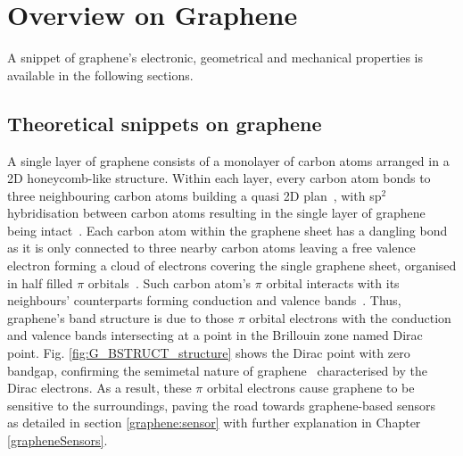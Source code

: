 \chapter{Overview on Graphene}
\label{grapheneTheory}
A snippet of graphene's electronic, geometrical and mechanical properties is available in the following sections.
\section{Theoretical snippets on graphene}
A single layer of graphene consists of a monolayer of carbon atoms arranged in a 2D honeycomb-like structure. Within each layer, every carbon atom bonds to three neighbouring carbon atoms building a quasi 2D plan~\cite{Neto2009}, with sp$^\textrm{2}$ hybridisation between carbon atoms resulting in the single layer of graphene being intact~\cite{Neto2009}. Each carbon atom within the graphene sheet has a dangling bond as it is only connected to three nearby carbon atoms leaving a free valence electron forming a cloud of electrons covering the single graphene sheet, organised in half filled $\pi$ orbitals~\cite{Neto2009}. Such carbon atom's $\pi$ orbital interacts with its neighbours' counterparts forming conduction and valence bands~\cite{Bolotin2008, Morozov2008, Basu2012}. Thus, graphene's band structure is due to those $\pi$ orbital electrons with the conduction and valence bands intersecting at a point in the Brillouin zone named Dirac point. Fig. \ref{fig:G_BSTRUCT_structure} shows the Dirac point with zero bandgap, confirming the semimetal nature of graphene~\cite{Wallace1947} characterised by the Dirac electrons. As a result, these $\pi$ orbital electrons cause graphene to be sensitive to the surroundings, paving the road towards graphene-based sensors~\cite{He2012, Mzali2016} as detailed in section \ref{graphene:sensor} with further explanation in Chapter \ref{grapheneSensors}.


